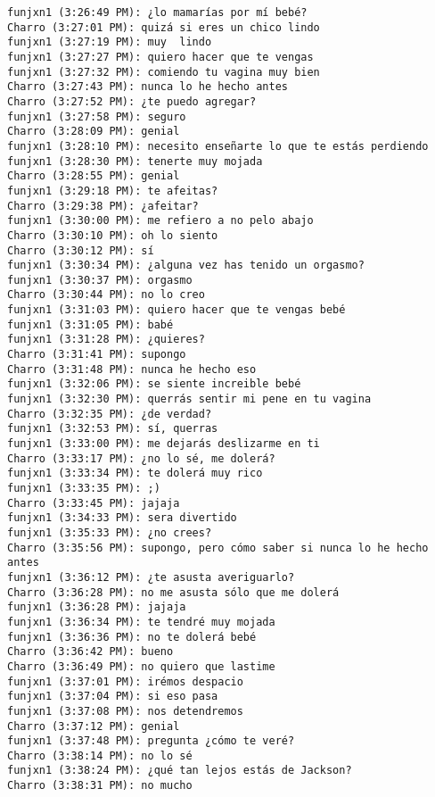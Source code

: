 \begin{verbatim}
funjxn1 (3:26:49 PM): ¿lo mamarías por mí bebé? 
Charro (3:27:01 PM): quizá si eres un chico lindo
funjxn1 (3:27:19 PM): muy  lindo
funjxn1 (3:27:27 PM): quiero hacer que te vengas
funjxn1 (3:27:32 PM): comiendo tu vagina muy bien
Charro (3:27:43 PM): nunca lo he hecho antes
Charro (3:27:52 PM): ¿te puedo agregar?
funjxn1 (3:27:58 PM): seguro
Charro (3:28:09 PM): genial
funjxn1 (3:28:10 PM): necesito enseñarte lo que te estás perdiendo 
funjxn1 (3:28:30 PM): tenerte muy mojada
Charro (3:28:55 PM): genial
funjxn1 (3:29:18 PM): te afeitas?
Charro (3:29:38 PM): ¿afeitar?
funjxn1 (3:30:00 PM): me refiero a no pelo abajo
Charro (3:30:10 PM): oh lo siento
Charro (3:30:12 PM): sí
funjxn1 (3:30:34 PM): ¿alguna vez has tenido un orgasmo?
funjxn1 (3:30:37 PM): orgasmo
Charro (3:30:44 PM): no lo creo
funjxn1 (3:31:03 PM): quiero hacer que te vengas bebé 
funjxn1 (3:31:05 PM): babé
funjxn1 (3:31:28 PM): ¿quieres?
Charro (3:31:41 PM): supongo
Charro (3:31:48 PM): nunca he hecho eso
funjxn1 (3:32:06 PM): se siente increible bebé
funjxn1 (3:32:30 PM): querrás sentir mi pene en tu vagina
Charro (3:32:35 PM): ¿de verdad?
funjxn1 (3:32:53 PM): sí, querras
funjxn1 (3:33:00 PM): me dejarás deslizarme en ti
Charro (3:33:17 PM): ¿no lo sé, me dolerá?
funjxn1 (3:33:34 PM): te dolerá muy rico
funjxn1 (3:33:35 PM): ;)
Charro (3:33:45 PM): jajaja
funjxn1 (3:34:33 PM): sera divertido
funjxn1 (3:35:33 PM): ¿no crees?
Charro (3:35:56 PM): supongo, pero cómo saber si nunca lo he hecho antes
funjxn1 (3:36:12 PM): ¿te asusta averiguarlo?
Charro (3:36:28 PM): no me asusta sólo que me dolerá
funjxn1 (3:36:28 PM): jajaja
funjxn1 (3:36:34 PM): te tendré muy mojada 
funjxn1 (3:36:36 PM): no te dolerá bebé
Charro (3:36:42 PM): bueno
Charro (3:36:49 PM): no quiero que lastime
funjxn1 (3:37:01 PM): irémos despacio
funjxn1 (3:37:04 PM): si eso pasa
funjxn1 (3:37:08 PM): nos detendremos
Charro (3:37:12 PM): genial
funjxn1 (3:37:48 PM): pregunta ¿cómo te veré?
Charro (3:38:14 PM): no lo sé
funjxn1 (3:38:24 PM): ¿qué tan lejos estás de Jackson?
Charro (3:38:31 PM): no mucho
\end{verbatim}